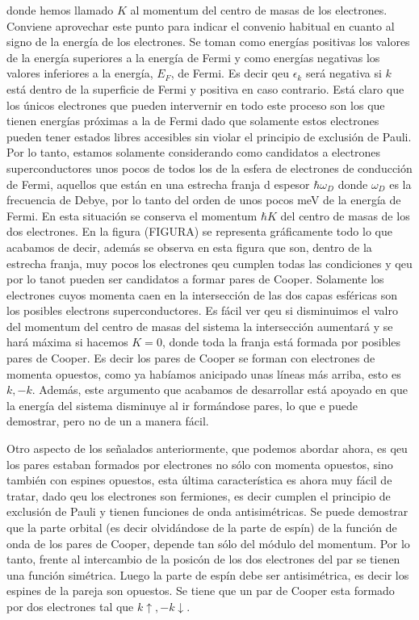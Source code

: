 donde hemos llamado $K$ al momentum del centro de masas de los electrones. Conviene aprovechar este punto para indicar el convenio habitual en cuanto al signo de la energía de los electrones. Se toman como energías positivas los valores de la energía superiores a la energía de Fermi y como energías negativas los valores inferiores a la energía, $E_F$, de Fermi. Es decir qeu $\epsilon_k$ será negativa si $k$ está dentro de la superficie de Fermi y positiva en caso contrario. Está claro que los únicos electrones que pueden intervernir en todo este proceso son los que tienen energías próximas a la de Fermi dado que solamente estos electrones pueden tener estados libres accesibles sin violar el principio de exclusión de Pauli. Por lo tanto, estamos solamente considerando como candidatos a electrones superconductores unos pocos de todos los de la esfera de electrones de conducción de Fermi, aquellos que están en una estrecha franja d espesor $\hbar \omega_D$ donde $\omega_D$ es la frecuencia de Debye, por lo tanto del orden de unos pocos meV de la energía de Fermi. En esta situación se conserva el momentum $\hbar K$ del centro de masas de los dos electrones. En la figura (FIGURA) se representa gráficamente todo lo que acabamos de decir, además se observa en esta figura que son, dentro de la estrecha franja, muy pocos los electrones qeu cumplen todas las condiciones y qeu por lo tanot pueden ser candidatos a formar pares de Cooper. Solamente los electrones cuyos momenta caen en la intersección de las dos capas esféricas son los posibles electrons superconductores. Es fácil ver qeu si disminuimos el valro del momentum del centro de masas del sistema la intersección aumentará y se hará máxima si hacemos $K = 0$, donde toda la franja está formada por posibles pares de Cooper. Es decir los pares de Cooper se forman con electrones de momenta opuestos, como ya habíamos anicipado unas líneas más arriba, esto es $k, -k$.  Además, este argumento que acabamos de desarrollar está apoyado en que la energía del sistema disminuye al ir formándose pares, lo que e puede demostrar, pero no de un a manera fácil.

Otro aspecto de los señalados anteriormente, que podemos abordar ahora, es qeu los pares estaban formados por electrones no sólo con momenta opuestos, sino también con espines opuestos, esta última característica es ahora muy fácil de tratar, dado qeu los electrones son fermiones, es decir cumplen el principio de exclusión de Pauli y tienen funciones de onda antisimétricas. Se puede demostrar que la parte orbital (es decir olvidándose de la parte de espín) de la función de onda de los pares de Cooper, depende tan sólo del módulo del momentum. Por lo tanto, frente al intercambio de la posicón de los dos electrones del par se tienen una función simétrica. Luego la parte de espín debe ser antisimétrica, es decir los espines de la pareja son opuestos. Se tiene que un par de Cooper esta formado por dos electrones tal que $k \uparrow, -k \downarrow$.

